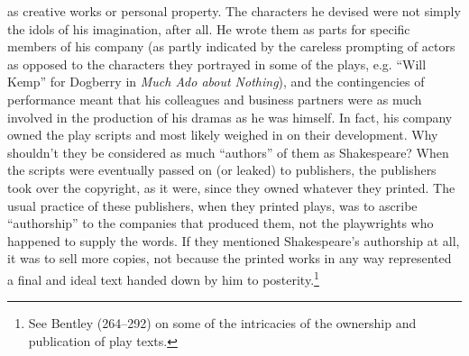 as creative works or personal property. The characters he devised were not simply the idols of his imagination, after all. He wrote them as parts for specific members of his company (as partly indicated by the careless prompting of actors as opposed to the characters they portrayed in some of the plays, e.g. ``Will Kemp'' for Dogberry in \emph{Much Ado about Nothing}), and the contingencies of performance meant that his colleagues and business partners were as much involved in the production of his dramas as he was himself. In fact, his company owned the play scripts and most likely weighed in on their development. Why shouldn't they be considered as much ``authors'' of them as Shakespeare? When the scripts were eventually passed on (or leaked) to publishers, the publishers took over the copyright, as it were, since they owned whatever they printed. The usual practice of these publishers, when they printed plays, was to ascribe ``authorship'' to the companies that produced them, not the playwrights who happened to supply the words. If they mentioned Shakespeare's authorship at all, it was to sell more copies, not because the printed works in any way represented a final and ideal text handed down by him to posterity.\footnote{See Bentley (264--292) on some of the intricacies of the ownership and publication of play texts.\nocite{bentley_profession_1984}}

